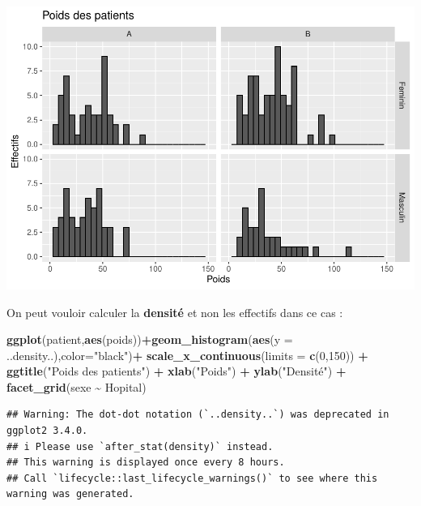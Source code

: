 \documentclass[
]{book}
\newenvironment{Shaded}{\begin{snugshade}}{\end{snugshade}}
\newcommand{\AttributeTok}[1]{\textcolor[rgb]{0.13,0.29,0.53}{#1}}
\newcommand{\DecValTok}[1]{\textcolor[rgb]{0.00,0.00,0.81}{#1}}
\newcommand{\FunctionTok}[1]{\textcolor[rgb]{0.13,0.29,0.53}{\textbf{#1}}}
\newcommand{\NormalTok}[1]{#1}
\newcommand{\SpecialCharTok}[1]{\textcolor[rgb]{0.81,0.36,0.00}{\textbf{#1}}}
\newcommand{\StringTok}[1]{\textcolor[rgb]{0.31,0.60,0.02}{#1}}
\begin{document}
\includegraphics{_main_files/figure-latex/ggplot10-1.pdf}

On peut vouloir calculer la \textbf{densité} et non les effectifs dans ce cas :

\begin{Shaded}
\begin{Highlighting}[]
\FunctionTok{ggplot}\NormalTok{(patient,}\FunctionTok{aes}\NormalTok{(poids))}\SpecialCharTok{+}\FunctionTok{geom\_histogram}\NormalTok{(}\FunctionTok{aes}\NormalTok{(}\AttributeTok{y =}\NormalTok{ ..density..),}\AttributeTok{color=}\StringTok{"black"}\NormalTok{)}\SpecialCharTok{+}
  \FunctionTok{scale\_x\_continuous}\NormalTok{(}\AttributeTok{limits =} \FunctionTok{c}\NormalTok{(}\DecValTok{0}\NormalTok{,}\DecValTok{150}\NormalTok{)) }\SpecialCharTok{+} 
  \FunctionTok{ggtitle}\NormalTok{(}\StringTok{"Poids des patients"}\NormalTok{) }\SpecialCharTok{+} 
  \FunctionTok{xlab}\NormalTok{(}\StringTok{"Poids"}\NormalTok{) }\SpecialCharTok{+} 
  \FunctionTok{ylab}\NormalTok{(}\StringTok{"Densité"}\NormalTok{) }\SpecialCharTok{+}
  \FunctionTok{facet\_grid}\NormalTok{(sexe }\SpecialCharTok{\textasciitilde{}}\NormalTok{ Hopital)}
\end{Highlighting}
\end{Shaded}

\begin{verbatim}
## Warning: The dot-dot notation (`..density..`) was deprecated in ggplot2 3.4.0.
## i Please use `after_stat(density)` instead.
## This warning is displayed once every 8 hours.
## Call `lifecycle::last_lifecycle_warnings()` to see where this warning was generated.
\end{verbatim}
\end{document}
